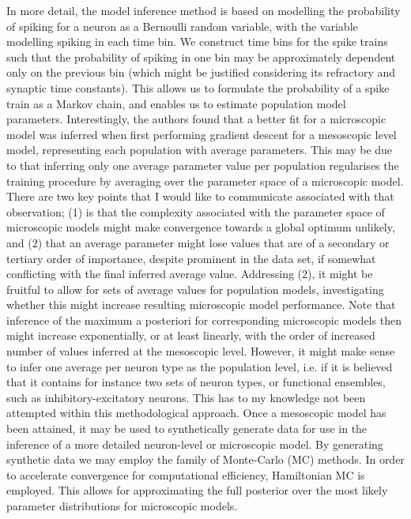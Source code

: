 \documentclass[mphil,deptreport,ai]{infthesis} %
\begin{document}
In more detail, the model inference method is based on modelling the probability of spiking for a neuron as a Bernoulli random variable, with the variable modelling spiking in each time bin. We construct time bins for the spike trains such that the probability of spiking in one bin may be approximately dependent only on the previous bin (which might be justified considering its refractory and synaptic time constants). This allows us to formulate the probability of a spike train as a Markov chain, and enables us to estimate population model parameters. Interestingly, the authors found that a better fit for a microscopic model was inferred when first performing gradient descent for a mesoscopic level model, representing each population with average parameters. 
This may be due to that inferring only one average parameter value per population regularises the training procedure by averaging over the parameter space of a microscopic model. 
There are two key points that I would like to communicate associated with that observation; (1) is that the complexity associated with the parameter space of microscopic models might make convergence towards a global optimum unlikely, and (2) that an average parameter might lose values that are of a secondary or tertiary order of importance, despite prominent in the data set, if somewhat conflicting with the final inferred average value. Addressing (2), it might be fruitful to allow for sets of average values for population models, investigating whether this might increase resulting microscopic model performance. Note that inference of the maximum a posteriori for corresponding microscopic models then might increase exponentially, or at least linearly, with the order of increased number of values inferred at the mesoscopic level. However, it might make sense to infer one average per neuron type as the population level, i.e. if it is believed that it contains for instance two sets of neuron types, or functional ensembles, such as inhibitory-excitatory neurons. This has to my knowledge not been attempted within this methodological approach.
Once a mesoscopic model has been attained, it may be used to synthetically generate data for use in the inference of a more detailed neuron-level or microscopic model. By generating synthetic data we may employ the family of Monte-Carlo (MC) methods. In order to accelerate convergence for computational efficiency, Hamiltonian MC is employed. This allows for approximating the full posterior over the most likely parameter distributions for microscopic models.
\end{document}
